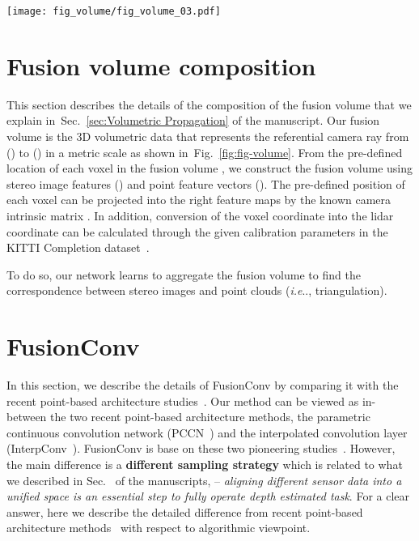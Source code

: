 \documentclass[letterpaper, 10 pt, conference]{ieeeconf}
\makeatletter
\DeclareRobustCommand\onedot{\futurelet\@let@token\@onedot}
\def\@onedot{\ifx\@let@token.\else.\null\fi\xspace}
\def\ie{\emph{i.e}\onedot} \def\Ie{{I.e}\onedot}
\newcommand{\Fref}[1]{Fig.~\textcolor{blue}{\ref{#1}}}
\newcommand{\Sref}[1]{Sec.~\textcolor{blue}{\ref{#1}}}
\newcommand{\RNum}[1]{\uppercase\expandafter{\romannumeral #1\relax}}
\makeatother
\begin{document}
\begin{figure*}[!t]
\centering
\texttt{[image: fig\_volume/fig\_volume\_03.pdf]}
\vspace{-2mm}
\caption{\textbf{Visualization of the composition of the fusion volume.} 
Under the known calibration parameters and the baseline between stereo cameras, there is a geometric relation between the location of the voxel  and the feature data from stereo images and point clouds. This geometric fact is utilized for the composition of the fusion volume.}
\vspace{-2mm}
\label{fig:fig-volume}
\end{figure*}
\section{Fusion volume composition}
\label{supp-sec:Fusion volume composition}
This section describes the details of the composition of the fusion volume that we explain in~\Sref{sec:Volumetric Propagation} of the manuscript. Our fusion volume is the 3D volumetric data that represents the referential camera ray from () to () in a metric scale  as shown in~\Fref{fig:fig-volume}. From the pre-defined location of each voxel  in the fusion volume , we construct the fusion volume using stereo image features () and point feature vectors (). The pre-defined position of each voxel  can be projected into the right feature maps by the known camera intrinsic matrix . In addition, conversion of the voxel coordinate  into the lidar coordinate  can be calculated through the given calibration parameters in the KITTI Completion dataset~\cite{kitti-completion}.

To do so, our network learns to aggregate the fusion volume to find the correspondence between stereo images and point clouds (\ie, triangulation). 

\section{FusionConv}
\label{supp-sec:FusionConv}
In this section, we describe the details of FusionConv by comparing it with the recent point-based architecture studies~\cite{continuous_conv,dynamic_graph_conv,interp_conv,pointnet}. Our method can be viewed as in-between the two recent point-based architecture methods, the parametric continuous convolution network (PCCN~\cite{continuous_conv}) and the interpolated convolution layer (InterpConv~\cite{interp_conv}). FusionConv is base on these two pioneering studies~\cite{continuous_conv,interp_conv}. However, the main difference is a \textbf{different sampling strategy} which is related to what we described in Sec.~\textcolor{red}{\RNum{1}} of the manuscripts, -- \textit{aligning different sensor data into a unified space is an essential step to fully operate depth estimated task}. For a clear answer, here we describe the detailed difference from recent point-based architecture methods~\cite{continuous_conv,interp_conv} with respect to algorithmic viewpoint.
\end{document}

